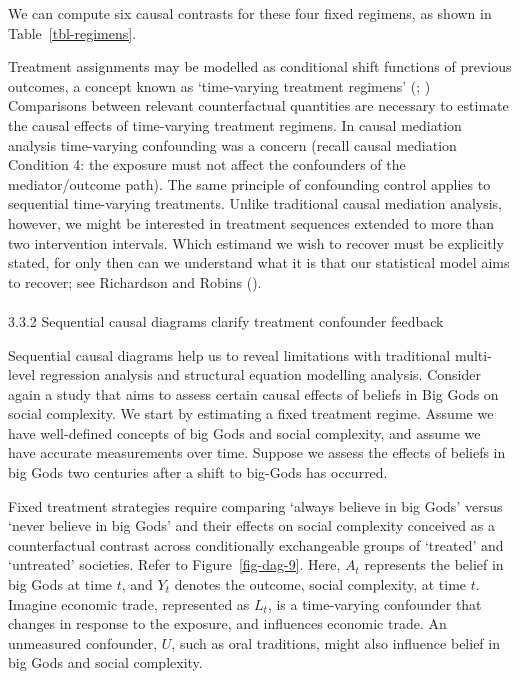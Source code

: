 \documentclass[
  singlecolumn]{article}
\makeatletter
\let\oldparagraph\paragraph
\renewcommand{\paragraph}{
    \@ifstar
      \xxxParagraphStar
      \xxxParagraphNoStar
  }
\newcommand{\xxxParagraphStar}[1]{\oldparagraph*{#1}\mbox{}}
\newcommand{\xxxParagraphNoStar}[1]{\oldparagraph{#1}\mbox{}}
\makeatother
\begin{document}
We can compute six causal contrasts for these four fixed regimens, as
shown in Table~\ref{tbl-regimens}.

Treatment assignments may be modelled as conditional shift functions of
previous outcomes, a concept known as `time-varying treatment regimens'
(;
) Comparisons
between relevant counterfactual quantities are necessary to estimate the
causal effects of time-varying treatment regimens. In causal mediation
analysis time-varying confounding was a concern (recall causal mediation
Condition 4: the exposure must not affect the confounders of the
mediator/outcome path). The same principle of confounding control
applies to sequential time-varying treatments. Unlike traditional causal
mediation analysis, however, we might be interested in treatment
sequences extended to more than two intervention intervals. Which
estimand we wish to recover must be explicitly stated, for only then can
we understand what it is that our statistical model aims to recover; see
Richardson and Robins ().

\paragraph{3.3.2 Sequential causal diagrams clarify treatment confounder
feedback}\label{sequential-causal-diagrams-clarify-treatment-confounder-feedback}

Sequential causal diagrams help us to reveal limitations with
traditional multi-level regression analysis and structural equation
modelling analysis. Consider again a study that aims to assess certain
causal effects of beliefs in Big Gods on social complexity. We start by
estimating a fixed treatment regime. Assume we have well-defined
concepts of big Gods and social complexity, and assume we have accurate
measurements over time. Suppose we assess the effects of beliefs in big
Gods two centuries after a shift to big-Gods has occurred.

Fixed treatment strategies require comparing `always believe in big
Gods' versus `never believe in big Gods' and their effects on social
complexity conceived as a counterfactual contrast across conditionally
exchangeable groups of `treated' and `untreated' societies. Refer to
Figure~\ref{fig-dag-9}. Here, \(A_{t}\) represents the belief in big
Gods at time \(t\), and \(Y_{t}\) denotes the outcome, social
complexity, at time \(t\). Imagine economic trade, represented as
\(L_{t}\), is a time-varying confounder that changes in response to the
exposure, and influences economic trade. An unmeasured confounder,
\(U\), such as oral traditions, might also influence belief in big Gods
and social complexity.
\end{document}
